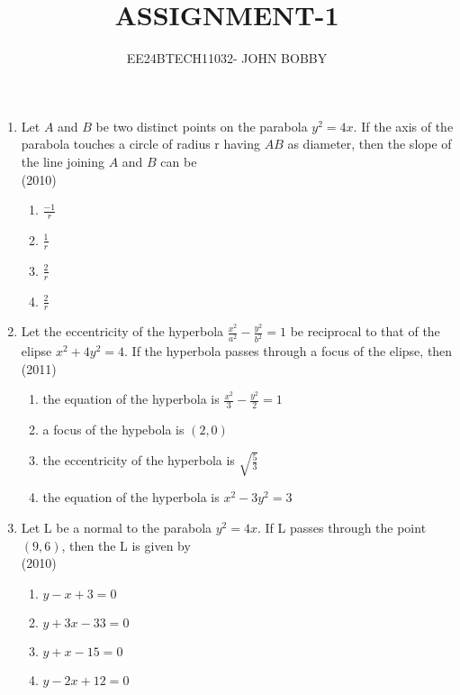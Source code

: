 \documentclass[journal,12pt,twocolumn]{IEEEtran}
\theoremstyle{remark}
\begin{document}

\vspace{3cm}

\title{ASSIGNMENT-1}
\author{EE24BTECH11032- JOHN BOBBY}
\maketitle
\newpage
\bigskip

\begin{enumerate}
	\item Let $A$ and $B$ be two distinct points on the parabola $y^2=4x$. If
the axis of the parabola touches a circle of radius r having
		$AB$ as diameter, then the slope of the line joining $A$ and $B$
 can be \\
		\hfill(2010)
		\\
		\begin{enumerate}
			\item$\frac{-1}{r}$
			\item$\frac{1}{r}$
			\item$\frac{2}{r}$
			\item$\frac{2}{r}$
		\end{enumerate}
	\item Let the eccentricity of the hyperbola $\frac{x^2}{a^2}-\frac{y^2}{b^2}=1$ be reciprocal to that of the elipse $x^2+4y^2=4$. If the hyperbola
	passes through a focus of the elipse, then \\
		\hfill(2011)
		\\
		\begin{enumerate}
			\item the equation of the hyperbola is $\frac{x^2}{3}-\frac{y^2}{2}=1$
			\item a focus of the hypebola is $(2,0)$
			\item the eccentricity of the hyperbola is $\sqrt{\frac{5}{3}}$
			\item the equation of the hyperbola is $x^2-3y^2=3$
		\end{enumerate}
	\item Let L be a normal to the parabola $y^2=4x$. If L passes through the point $(9,6)$, then the L is given by \\
		\hfill(2010)
		\\
		\begin{enumerate}
			\item $y-x+3=0$
			\item $y+3x-33=0$
			\item $y+x-15=0$
			\item $y-2x+12=0$
		\end{enumerate}

\end{enumerate}
\end{document}
